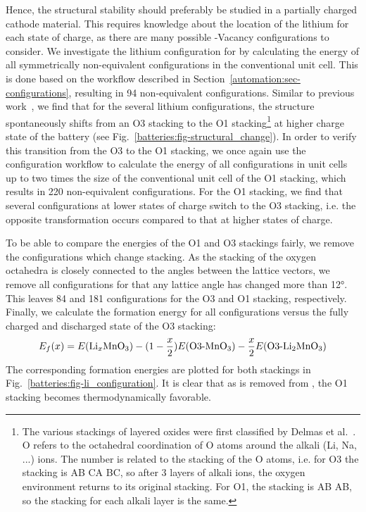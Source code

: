 \begin{refsection}
Hence, the structural stability should preferably be studied in a partially 
charged cathode material. This requires knowledge about the location of the 
lithium for each state of charge, as there are many possible -Vacancy 
configurations to consider. We investigate the lithium configuration for 
 by calculating the energy of all symmetrically non-equivalent 
configurations in the conventional unit cell. This is done based on the 
workflow described in Section~\ref{automation:sec-configurations}, resulting 
in 94 non-equivalent configurations. Similar to previous 
work~\cite{Koyama2009}, we find that for the several lithium configurations, 
the  structure spontaneously shifts from an O3 stacking to the O1 
stacking\footnote{The various stackings of layered oxides were first classified 
by Delmas et al.~\cite{Delmas1980}. O refers to the octahedral coordination 
of O atoms around the alkali (Li, Na, ...) ions. The number is related to 
the stacking of the O atoms, i.e. for O3 the stacking is AB CA BC, so after 
3 layers of alkali ions, the oxygen environment returns to its original 
stacking. For O1, the stacking is AB AB, so the stacking for each alkali 
layer is the same.} at higher charge state of the battery 
(see Fig.~\ref{batteries:fig-structural_change}). In order to verify this transition from 
the O3 to the O1 stacking, we once again use the configuration workflow to 
calculate the energy of all  configurations in unit cells up to two 
times the size of the conventional unit cell of the O1 stacking, which results 
in 220 non-equivalent configurations. For the O1 stacking, we find that 
several configurations at lower states of charge switch to the O3 stacking, 
i.e. the opposite transformation occurs compared to that at higher states of 
charge. 

To be able to compare the energies of the O1 and O3 stackings fairly, we 
remove the configurations which change stacking. As the stacking 
of the oxygen octahedra is closely connected to the angles between the 
lattice vectors, we remove all configurations for that any lattice angle has 
changed more than 12\si{\degree}. This leaves 84 and 181 configurations for 
the O3 and O1 stacking, respectively. Finally, we calculate the formation 
energy for all configurations versus the fully charged and discharged state of 
the O3 stacking: 
\begin{equation} 
E_f (x) = E(\ce{Li_xMnO3}) - (1 - \frac{x}{2}) E(\text{O3-}\ce{MnO3}) - 
\frac{x}{2} E(\text{O3-}\ce{Li2MnO3}) 
\end{equation} 
The corresponding formation energies are plotted for both stackings in 
Fig.~\ref{batteries:fig-li_configuration}. It is clear that as  is 
removed from , the O1 stacking becomes thermodynamically 
favorable. 
 

\end{refsection}
